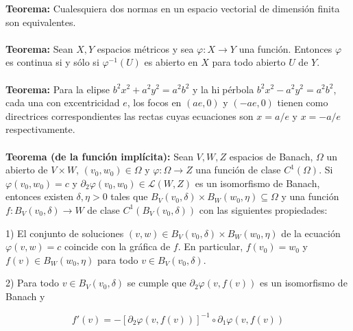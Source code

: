 \documentclass[a4paper,11pt, twocolumn]{article}
\newcommand{\Ll}{\mathcal{L}}
\newcommand{\1}{\mathbbm{1}}
\begin{document}
\textbf{Teorema:} Cualesquiera dos normas en un espacio vectorial de dimensión finita son equivalentes.\\\\

\textbf{Teorema:} Sean $X,Y$ espacios métricos y sea $\varphi:X\to Y$ una función. Entonces $\varphi$ es continua si y sólo si $\varphi^{-1}(U)$ es abierto en $X$ para todo abierto $U$ de $Y$.\\\\

\textbf{Teorema:} Para la elipse $b^2x^2+a^2y^2 = a^2b^2$ y la hipérbola $b^2x^2-a^2y^2 = a^2b^2$, cada una con excentricidad $e$, los focos en $(ae,0)$ y $(-ae,0)$ tienen como directrices correspondientes las rectas cuyas ecuaciones son $x=a/e$ y $x=-a/e$ respectivamente.\\\\

\textbf{Teorema (de la función implícita):} Sean $V,W,Z$ espacios de Banach, $\Omega$ un abierto de $V\times W$, $(v_0,w_0)\in\Omega$ y $\varphi :\Omega \to Z$ una función de clase $C^1(\Omega)$. Si $\varphi(v_0,w_0) = c$ y $\partial_2 \varphi(v_0,w_0)\in \Ll(W,Z)$ es un isomorfismo de Banach, entonces existen $\delta, \eta>0$ tales que $B_V(v_0,\delta)\times B_W(w_0,\eta)\subseteq \Omega$ y una función $f:B_V(v_0,\delta)\to W$ de clase $C^1(B_V(v_0,\delta))$ con las siguientes propiedades:

1) El conjunto de soluciones $(v,w)\in B_V(v_0,\delta)\times B_W(w_0,\eta)$ de la ecuación $\varphi(v,w)=c$ coincide con la gráfica de $f$. En particular, $f(v_0)=w_0$ y $f(v) \in B_W(w_0,\eta)$ para todo $v\in B_V(v_0,\delta)$.

2) Para todo $v\in B_V(v_0,\delta)$ se cumple que $\partial_2\varphi(v,f(v))$ es un isomorfismo de Banach y 

\[f'(v) = -[\partial_2\varphi(v,f(v))]^{-1}\circ \partial_1\varphi(v,f(v))\]
\end{document}

